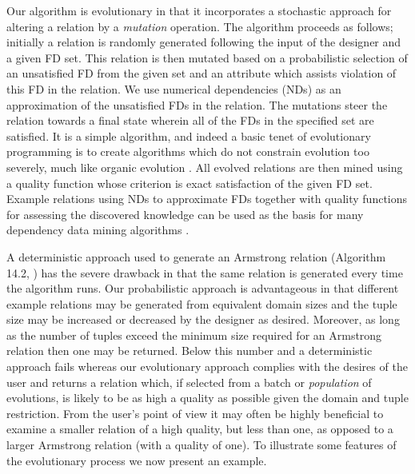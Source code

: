 \smallskip

Our algorithm is evolutionary in that it incorporates a stochastic approach
for altering a relation by a {\em mutation} operation.
 The algorithm proceeds as
follows; initially a relation is randomly generated following
the input of the designer and a given FD set. This relation is then
 mutated based on a probabilistic selection of an unsatisfied FD  from the
given set and an attribute which assists violation of this FD in the relation.
We use numerical dependencies (NDs) \cite{gm85a,gm85b} as an
approximation of the unsatisfied FDs in the relation. 
The mutations steer the relation
towards a final state wherein all of the FDs in the specified set are
satisfied. It is a simple algorithm, and indeed a basic tenet 
of evolutionary programming is to create algorithms 
which do not constrain evolution too severely,
 much like organic evolution \cite{bs93}. All evolved relations are then mined 
using a quality function whose criterion is exact satisfaction of the given FD set. Example relations using NDs to approximate FDs together
with quality functions for assessing the discovered knowledge 
can be used as the basis for many dependency data mining algorithms \cite{kdd96}.

\smallskip

A deterministic approach used to generate an Armstrong relation
(Algorithm 14.2, \cite{Mann92}) has the severe drawback
 in that the same relation
is generated every time the algorithm runs.  Our probabilistic
approach is advantageous in that different example relations may
be generated from equivalent domain sizes and the tuple size may be
increased or decreased by the designer as desired. Moreover, as long as 
the number of tuples exceed the minimum size required for an Armstrong relation
 \cite{bdfs84,mr86} then one may
be returned.  Below this number and a deterministic approach fails
 whereas our evolutionary approach complies with the desires of the user
and returns a relation which, if selected from a batch or {\em 
population} of evolutions, is likely to be as high a quality
as possible given the domain and tuple restriction.  From the user's
point of view it may often be highly beneficial to examine a smaller
relation of a high quality, but less than one, as opposed to a larger Armstrong
relation (with a quality of one). To illustrate some
features of the evolutionary process we now present an example.


